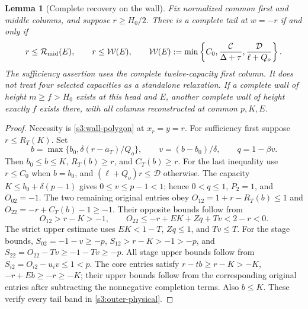 \documentclass[11pt,reqno]{amsart}
\newtheorem{lemma}[theorem]{Lemma}
\theoremstyle{definition}
\theoremstyle{remark}
\begin{document}
\begin{lemma}[Complete recovery on the wall]
\label{s3:wall-reconstruction}
Fix normalized common first and middle columns, and suppose
\(r\ge H_0/2\). There is a complete tail at \(w=-r\) if and only if
\[
 r\le\mathcal R_{\rm mid}(E),\qquad r\le\mathcal W(E),\qquad
 \mathcal W(E):=\min\left\{C_0,
 \frac{\mathcal C}{\Delta+\tau},
 \frac{\mathcal D}{\ell+Q_o}\right\}.
\]
The sufficiency assertion uses the complete twelve-capacity first
column. It does not treat four selected capacities as a standalone
relaxation. If a complete wall of height \(m\ge f>H_0\) exists
at this head and \(E\), another complete wall of height exactly
\(f\) exists there, with all columns reconstructed at common
\(p,K,E\).
\end{lemma}
\begin{proof}
Necessity is \eqref{s3:wall-polygon} at \(x_r=y=r\).
For sufficiency first suppose \(r\le R_T(K)\). Set
\[
 b=\max\{b_0,\delta(r-a_T)/Q_o\},\qquad
 v=(b-b_0)/\delta,\qquad q=1-\beta v.
\]
Then \(b_0\le b\le K\), \(R_T(b)\ge r\), and
\(C_T(b)\ge r\). For the last inequality use \(r\le C_0\)
when \(b=b_0\), and
\((\ell+Q_o)r\le\mathcal D\) otherwise.
The capacity \(K\le b_0+\delta(p-1)\) gives
\(0\le v\le p-1<1\); hence \(0<q\le1\), \(P_2=1\),
and \(O_{02}=-1\). The two remaining original entries obey
\(O_{12}=1+r-R_T(b)\le1\) and
\(O_{22}=-r+C_T(b)-1\ge-1\).
Their opposite bounds follow from
\[
 O_{12}>r-K>-1,\qquad
 O_{22}\le-r+EK+Zq+Tv<2-r<0.
\]
The strict upper estimate uses \(EK<1-T\), \(Zq\le1\),
and \(Tv\le T\). For the stage bounds,
\(S_{02}=-1-v\ge-p\), \(S_{12}>r-K>-1>-p\), and
\(S_{22}=O_{22}-Tv\ge-1-Tv\ge-p\).
All stage upper bounds follow from \(S_{i2}=O_{i2}-u_iv\le1<p\).
The core entries satisfy
\(r-tb\ge r-K>-K\), \(-r+Eb\ge-r\ge-K\);
their upper bounds follow from the corresponding original entries
after subtracting the nonnegative completion terms. Also \(b\le K\).
These verify every tail band in \eqref{s3:outer-physical}.


\end{proof}
\end{document}
